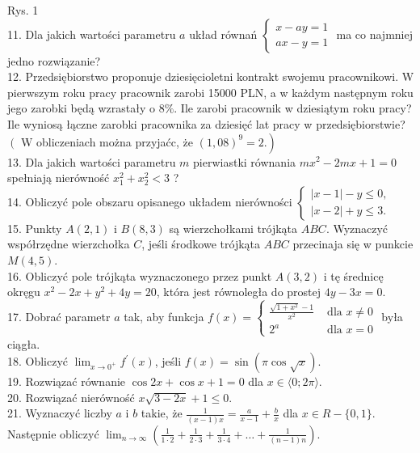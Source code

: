 \documentclass[10pt]{article}
\begin{document}
Rys. 1\\
11. Dla jakich wartości parametru \(a\) układ równań \(\left\{\begin{array}{l}x-a y=1 \\ a x-y=1\end{array}\right.\) ma co najmniej jedno rozwiązanie?\\
12. Przedsiębiorstwo proponuje dziesięcioletni kontrakt swojemu pracownikowi. W pierwszym roku pracy pracownik zarobi 15000 PLN, a w każdym następnym roku jego zarobki będą wzrastały o \(8 \%\). Ile zarobi pracownik w dziesiątym roku pracy? Ile wyniosą łączne zarobki pracownika za dziesięć lat pracy w przedsiębiorstwie? \(\left(\right.\) W obliczeniach można przyjaćc, że \(\left.(1,08)^{9}=2.\right)\)\\
13. Dla jakich wartości parametru \(m\) pierwiastki równania \(m x^{2}-2 m x+1=0\) spełniają nierówność \(x_{1}^{2}+x_{2}^{2}<3\) ?\\
14. Obliczyć pole obszaru opisanego układem nierówności \(\left\{\begin{array}{l}|x-1|-y \leqslant 0, \\ |x-2|+y \leqslant 3 .\end{array}\right.\)\\
15. Punkty \(A(2,1)\) i \(B(8,3)\) są wierzchołkami trójkąta \(A B C\). Wyznaczyć współrzędne wierzchołka \(C\), jeśli środkowe trójkąta \(A B C\) przecinaja się w punkcie \(M(4,5)\).\\
16. Obliczyć pole trójkąta wyznaczonego przez punkt \(A(3,2)\) i tę średnicę okręgu \(x^{2}-2 x+y^{2}+4 y=20\), która jest równoległa do prostej \(4 y-3 x=0\).\\
17. Dobrać parametr \(a\) tak, aby funkcja \(f(x)=\left\{\begin{array}{cl}\frac{\sqrt{1+x^{2}}-1}{x^{2}} & \text { dla } x \neq 0 \\ 2^{a} & \text { dla } x=0\end{array}\right.\) była ciągła.\\
18. Obliczyć \(\lim _{x \rightarrow 0^{+}} f^{\prime}(x)\), jeśli \(f(x)=\sin (\pi \cos \sqrt{x})\).\\
19. Rozwiązać równanie \(\cos 2 x+\cos x+1=0\) dla \(x \in\langle 0 ; 2 \pi\rangle\).\\
20. Rozwiązać nierówność \(x \sqrt{3-2 x}+1 \leqslant 0\).\\
21. Wyznaczyć liczby \(a\) i \(b\) takie, że \(\frac{1}{(x-1) x}=\frac{a}{x-1}+\frac{b}{x}\) dla \(x \in R-\{0,1\}\). Następnie obliczyć \(\lim _{n \rightarrow \infty}\left(\frac{1}{1 \cdot 2}+\frac{1}{2 \cdot 3}+\frac{1}{3 \cdot 4}+\ldots+\frac{1}{(n-1) n}\right)\).\\
\end{document}
